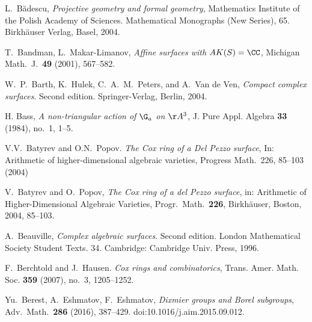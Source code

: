 L.~B\u{a}descu, \emph{Projective geometry and formal geometry}, Mathematics Institute of the Polish Academy of Sciences.
Mathematical Monographs (New Series), 65. Birkh\"auser Verlag, Basel, 2004.

T.~Bandman, L.~Makar-Limanov, \emph{Affine surfaces with $AK(S) = \CC$},
Michigan Math.\ J.\ \textbf{49} (2001),
567--582.


W.~P.~Barth, K.~Hulek,
C.~A.~M.~Peters, and A.~Van de Ven,
\emph{Compact complex surfaces}.
Second edition. Springer-Verlag, Berlin, 2004.

H. Bass, \emph{A non-triangular action of $\G_a$ on $\AA^3$}, J. Pure Appl. Algebra \textbf{33} (1984), no.~1, 1--5.


V.V.~Batyrev and O.N.~Popov.
\emph{The Cox ring of a Del Pezzo surface}, In: Arithmetic of higher-dimensional algebraic varieties, Progress Math.~226,
85--103 (2004)

V.~Batyrev and O.~Popov,
\emph{The Cox ring of a del Pezzo surface},
in: Arithmetic of Higher-Dimensional Algebraic Varieties, Progr.\ Math.\ \textbf{226},
Birkh\"auser, Boston, 2004, 85--103.

A.~Beauville,
\emph{Complex algebraic surfaces}.
Second edition.
London Mathematical Society Student Texts. 34.
Cambridge: Cambridge Univ. Press, 1996.



F.~Berchtold and J.~Hausen.
\emph{Cox rings and combinatorics}, Trans. Amer. Math. Soc. \textbf{359} (2007), no.~3, 1205--1252.

Yu.~Berest, A.~Eshmatov, F.~Eshmatov,
\emph{Dixmier groups and Borel subgroups},
Adv.\ Math.\ \textbf{286} (2016), 387--429.
doi:10.1016/j.aim.2015.09.012.

